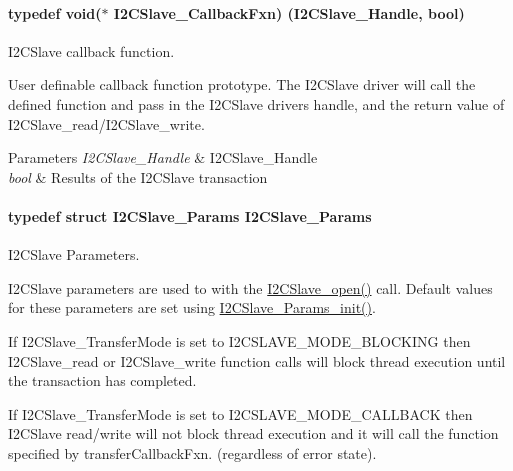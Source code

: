 \paragraph[{I2\+C\+Slave\+\_\+\+Callback\+Fxn}]{\setlength{\rightskip}{0pt plus 5cm}typedef void($\ast$ I2\+C\+Slave\+\_\+\+Callback\+Fxn) ({\bf I2\+C\+Slave\+\_\+\+Handle}, bool)}\label{_i2_c_slave_8h_a2f0d1d9022a0668ad78e7ff37298d24a}


I2\+C\+Slave callback function. 

User definable callback function prototype. The I2\+C\+Slave driver will call the defined function and pass in the I2\+C\+Slave driver\textquotesingle{}s handle, and the return value of I2\+C\+Slave\+\_\+read/\+I2\+C\+Slave\+\_\+write.


\begin{DoxyParams}{Parameters}
{\em I2\+C\+Slave\+\_\+\+Handle} & I2\+C\+Slave\+\_\+\+Handle\\
\hline
{\em bool} & Results of the I2\+C\+Slave transaction \\
\hline
\end{DoxyParams}
\paragraph[{I2\+C\+Slave\+\_\+\+Params}]{\setlength{\rightskip}{0pt plus 5cm}typedef struct {\bf I2\+C\+Slave\+\_\+\+Params}  {\bf I2\+C\+Slave\+\_\+\+Params}}\label{_i2_c_slave_8h_a9cd68573732e7853e3b14af2ec7e7652}


I2\+C\+Slave Parameters. 

I2\+C\+Slave parameters are used to with the \hyperlink{_i2_c_slave_8h_abdfc770ace6accbf91b91f3e195e7119}{I2\+C\+Slave\+\_\+open()} call. Default values for these parameters are set using \hyperlink{_i2_c_slave_8h_a3c29bf7436be17348ea73fabb6ede3ae}{I2\+C\+Slave\+\_\+\+Params\+\_\+init()}.

If I2\+C\+Slave\+\_\+\+Transfer\+Mode is set to I2\+C\+S\+L\+A\+V\+E\+\_\+\+M\+O\+D\+E\+\_\+\+B\+L\+O\+C\+K\+I\+N\+G then I2\+C\+Slave\+\_\+read or I2\+C\+Slave\+\_\+write function calls will block thread execution until the transaction has completed.

If I2\+C\+Slave\+\_\+\+Transfer\+Mode is set to I2\+C\+S\+L\+A\+V\+E\+\_\+\+M\+O\+D\+E\+\_\+\+C\+A\+L\+L\+B\+A\+C\+K then I2\+C\+Slave read/write will not block thread execution and it will call the function specified by transfer\+Callback\+Fxn. (regardless of error state).

